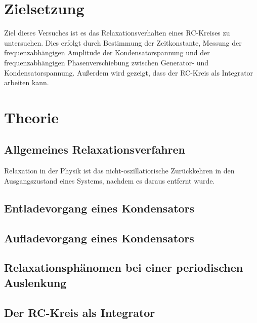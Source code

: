 \section{Zielsetzung}
\label{sec:Zielsetzung}

Ziel dieses Versuches ist es das Relaxationsverhalten eines RC-Kreises zu untersuchen. 
Dies erfolgt durch Bestimmung der Zeitkonstante, Messung der frequenzabhängigen Amplitude der Kondensatorspannung und 
der frequenzabhängigen Phasenverschiebung zwischen Generator- und Kondensatorspannung.
Außerdem wird gezeigt, dass der RC-Kreis als Integrator arbeiten kann.


\section{Theorie}
\label{sec:Theorie}

\subsection{Allgemeines Relaxationsverfahren} %
\label{sub:Allgemein}
Relaxation in der Physik ist das nicht-oszillatiorische Zurückkehren in den Ausgangszustand eines Systems, nachdem es daraus entfernt wurde.


\subsection{Entladevorgang eines Kondensators} %
\label{sub:Entladevorgang}




\subsection{Aufladevorgang eines Kondensators} %
\label{sub:Aufladevorgang}



\subsection{Relaxationsphänomen bei einer periodischen Auslenkung} %
\label{sub:Rela_peri}


\subsection{Der RC-Kreis als Integrator} %
\label{sub:Integrator4}


